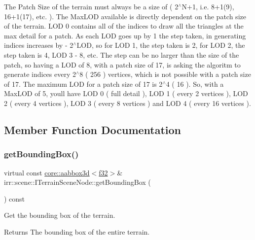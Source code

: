 The Patch Size of the terrain must always be a size of ( 2$^\wedge$\+N+1, i.\+e. 8+1(9), 16+1(17), etc. ). The Max\+L\+OD available is directly dependent on the patch size of the terrain. L\+OD 0 contains all of the indices to draw all the triangles at the max detail for a patch. As each L\+OD goes up by 1 the step taken, in generating indices increases by -\/ 2$^\wedge$\+L\+OD, so for L\+OD 1, the step taken is 2, for L\+OD 2, the step taken is 4, L\+OD 3 -\/ 8, etc. The step can be no larger than the size of the patch, so having a L\+OD of 8, with a patch size of 17, is asking the algoritm to generate indices every 2$^\wedge$8 ( 256 ) vertices, which is not possible with a patch size of 17. The maximum L\+OD for a patch size of 17 is 2$^\wedge$4 ( 16 ). So, with a Max\+L\+OD of 5, you\textquotesingle{}ll have L\+OD 0 ( full detail ), L\+OD 1 ( every 2 vertices ), L\+OD 2 ( every 4 vertices ), L\+OD 3 ( every 8 vertices ) and L\+OD 4 ( every 16 vertices ). 

\subsection{Member Function Documentation}
\mbox{\label{classirr_1_1scene_1_1ITerrainSceneNode_a02a14fe28f5a326fca819c36bee2e92e}} 
\subsubsection{\texorpdfstring{get\+Bounding\+Box()}{getBoundingBox()}\hspace{0.1cm}{\footnotesize\ttfamily [1/2]}}
{\footnotesize\ttfamily virtual const \hyperlink{classirr_1_1core_1_1aabbox3d}{core\+::aabbox3d}$<$\hyperlink{namespaceirr_a0277be98d67dc26ff93b1a6a1d086b07}{f32}$>$\& irr\+::scene\+::\+I\+Terrain\+Scene\+Node\+::get\+Bounding\+Box (\begin{DoxyParamCaption}{ }\end{DoxyParamCaption}) const\hspace{0.3cm}{\ttfamily [pure virtual]}}



Get the bounding box of the terrain. 

\begin{DoxyReturn}{Returns}
The bounding box of the entire terrain. 
\end{DoxyReturn}


